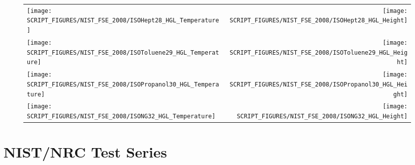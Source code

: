 \begin{figure}[p]
\begin{tabular*}{\textwidth}{l@{\extracolsep{\fill}}r}
\texttt{[image: SCRIPT\_FIGURES/NIST\_FSE\_2008/ISOHept28\_HGL\_Temperature]} &
\texttt{[image: SCRIPT\_FIGURES/NIST\_FSE\_2008/ISOHept28\_HGL\_Height]} \\
\texttt{[image: SCRIPT\_FIGURES/NIST\_FSE\_2008/ISOToluene29\_HGL\_Temperature]} &
\texttt{[image: SCRIPT\_FIGURES/NIST\_FSE\_2008/ISOToluene29\_HGL\_Height]} \\
\texttt{[image: SCRIPT\_FIGURES/NIST\_FSE\_2008/ISOPropanol30\_HGL\_Temperature]} &
\texttt{[image: SCRIPT\_FIGURES/NIST\_FSE\_2008/ISOPropanol30\_HGL\_Height]} \\
\texttt{[image: SCRIPT\_FIGURES/NIST\_FSE\_2008/ISONG32\_HGL\_Temperature]} &
\texttt{[image: SCRIPT\_FIGURES/NIST\_FSE\_2008/ISONG32\_HGL\_Height]}
\end{tabular*}
\label{NIST_FSE_2008_HGL_Temp_6}
\end{figure}


\clearpage

\section{NIST/NRC Test Series}

